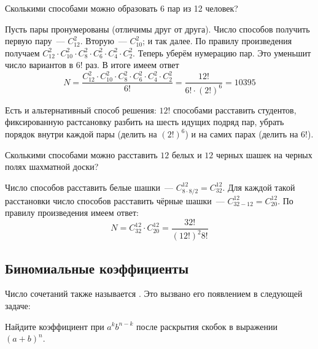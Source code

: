 \begin{Exercise}[counter=SecExercise, label={exercise:combinatorics:num_of_pairs}]
    \noindent
    Сколькими способами можно образовать 6 пар из 12 человек?
\end{Exercise}

\begin{Answer}
    \noindent
    Пусть пары пронумерованы (отличимы друг от друга).
    Число способов получить первую пару~--- $ C_{12}^2 $.
    Вторую~--- $ C_{10}^2 $; и так далее.
    По правилу произведения получаем $ C_{12}^2 \cdot C_{10}^2 \cdot C_8^2 \cdot C_6^2 \cdot C_4^2 \cdot C_2^2 $.
    Теперь уберём нумерацию пар.
    Это уменьшит число вариантов в $ 6! $ раз.
    В итоге имеем ответ
    \[
        N = \frac{C_{12}^2 \cdot C_{10}^2 \cdot C_8^2 \cdot C_6^2 \cdot C_4^2 \cdot C_2^2}{6!} = \frac{12!}{6! \cdot (2!)^6} = 10395
    \]

    Есть и альтернативный способ решения: $ 12! $ способами расставить студентов,
    фиксированную растсановку разбить на шесть идущих подряд пар,
    убрать порядок внутри каждой пары (делить на $ (2!)^6 $) и на самих парах (делить на $ 6! $).
\end{Answer}


\begin{Exercise}[counter=SecExercise, label={exercise:combinatorics:checkers}]
    \noindent
    Сколькими способами можно расставить $ 12 $ белых и $ 12 $ черных шашек на черных полях шахматной доски?
\end{Exercise}

\begin{Answer}
    \noindent
    Число способов расставить белые шашки~--- $ C_{8 \cdot 8 / 2}^{12} = C_{32}^{12} $.
    Для каждой такой расстановки число способов расставить чёрные шашки~--- $ C_{32 - 12}^{12} = C_{20}^{12} $.
    По правилу произведения имеем ответ:
    \[
        N = C_{32}^{12} \cdot C_{20}^{12} = \frac{32!}{(12!)^2 8!}
    \]
\end{Answer}



\subsection{Биномиальные коэффициенты}
\label{subsec:combinatorics:binomial}

Число сочетаний также называется .
Это вызвано его появлением в следующей задаче:

\begin{Exercise}[counter=SecExercise]
    \noindent
    Найдите коэффициент при $ a^k b^{n-k} $ после раскрытия скобок в выражении $ (a + b)^n $. %
\end{Exercise}

